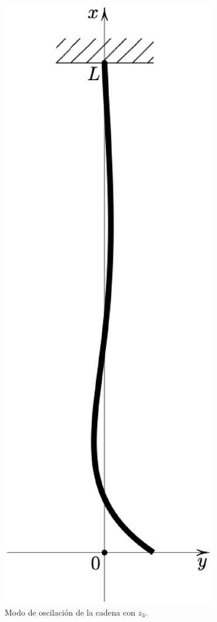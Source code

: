 \begin{figure}[H]
    \centering
    \includegraphics[scale=0.3]{Imagenes/Cadena_Oscilante_05_png.eps}
    \caption{Modo de oscilación de la cadena con $z_{3}$.}
    \label{fig:figura_modo_z3}
\end{figure}

